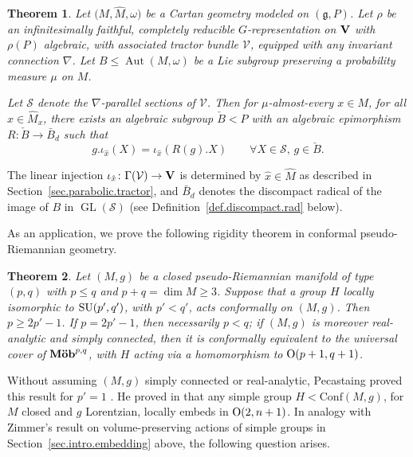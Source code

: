 \documentclass[pdftex]{sigma}
\numberwithin{equation}{section}
\newtheorem{thm}{Theorem}[section]
\theoremstyle{definition}
\def\V{{\bf V}}
\newcommand{\cV}{{\mathcal V}}
\newcommand{\lieg}{\mathfrak{g}}
\newcommand{\GL}{{\operatorname{GL}}}
\newcommand{\SU}{{\rm SU}}
\begin{document}
\begin{thm}
\label{thm.embedding-0}
 Let $\bigl(M, \hat{M}, \omega\bigr)$ be a Cartan geometry modeled on $(\lieg,P)$. Let $\rho$ be an infinitesimally faithful, completely reducible $G$-representation on $\V$ with $\rho(P)$ algebraic, with associated tractor bundle $\mathcal{V}$, equipped with any invariant connection $\nabla$.
 Let $B \leq \operatorname{Aut}(M,\omega)$ be a Lie subgroup preserving a
 probability measure $\mu$ on $M$.

Let $\mathcal{S}$ denote the $\nabla$-parallel sections of $\cV$.
Then for $\mu$-almost-every $x \in M$, for all $\hat{x} \in \hat{M}_x$, there exists
an algebraic subgroup $\check{B} <P$ with an algebraic epimorphism $R\colon \check{B} \rightarrow \bar{B}_d$ such that
\[ g .\iota_{\hat{x}} (X) = \iota_{\hat{x}} \left( R(g). X \right) \qquad \forall X \in \mathcal{S},\, g \in \check{B}.\]

\end{thm}
\noindent The linear injection $\iota_{\hat{x}}\colon \Gamma(\mathcal{V}) \rightarrow {\bf V}$ is determined by $\hat{x} \in \hat{M}$ as described in Section~\ref{sec.parabolic.tractor}, and $\bar{B}_d$ denotes the discompact radical of the image of $B$ in $\GL(\mathcal{S})$ (see Definition~\ref{def.discompact.rad} below).

As an application, we prove the following rigidity theorem in conformal pseudo-Riemannian geometry.

\begin{thm}
\label{thm.conf.application}
Let $(M,g)$ be a closed pseudo-Riemannian manifold of type $(p,q)$ with $p\leq q$ and $p+q = \dim M \geq 3$. Suppose that a group $H$ locally isomorphic to $\SU(p',q')$, with $p'<q'$, acts conformally on $(M,g)$. Then $p \geq 2p'-1$. If $p=2p'-1$, then necessarily $p<q$; if $(M,g)$ is moreover real-analytic and simply connected, then it is conformally equivalent to the universal cover of $\mbox{{\bf M\"ob}}^{p,q}$, with $H$ acting via a homomorphism to ${\rm O}(p+1,q+1)$.
\end{thm}

Without assuming $(M,g)$ simply connected or real-analytic, Pecastaing proved this result for $p'=1$ \cite[Corollary~1]{pecastaing.smooth.sl2r}. He proved in \cite[Theorem~3]{pecastaing.rank1} that any simple group $H < \mbox{Conf}(M,g)$, for $M$ closed and $g$ Lorentzian, locally embeds in ${\rm O}(2,n+1)$. In analogy with Zimmer's result on volume-preserving actions of simple groups
in Section~\ref{sec.intro.embedding} above, the following question arises.
\end{document}
